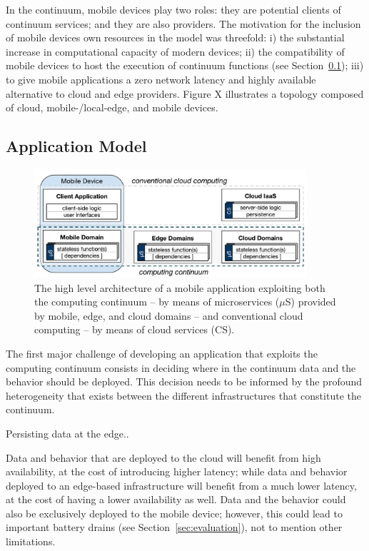 In the continuum, mobile devices play two roles: they are potential clients of continuum services; and they are also providers. The motivation for the inclusion of mobile devices own resources in the model was threefold: i) the substantial increase in computational capacity of modern devices; ii) the compatibility of mobile devices to host the execution of continuum functions (see Section~\ref{sec:application_model}); iii) to give mobile applications a zero network latency and highly available alternative to cloud and edge providers. Figure X illustrates a topology composed of cloud, mobile-/local-edge, and mobile devices.


\subsection{Application Model}\label{sec:application_model}

\begin{figure}[tbp]
	\includegraphics[width=0.9\textwidth]{figs/Continuum-arch}
	\caption{The high level architecture of a mobile application exploiting both the computing continuum -- by means of microservices ($\mu$S) provided by mobile, edge, and cloud domains -- and conventional cloud computing -- by means of cloud services (CS).}
	\label{fig:Continuum-arch}
\end{figure}

The first major challenge of developing an application that exploits the computing continuum consists in deciding where in the continuum data and the behavior should be deployed. This decision needs to be informed by the profound heterogeneity that exists between the different infrastructures that constitute the continuum.

Persisting data at the edge.. 

Data and behavior that are deployed to the cloud will benefit from high availability, at the cost of introducing higher latency; while data and behavior deployed to an edge-based infrastructure will benefit from a much lower latency, at the cost of having a lower availability as well. Data and the behavior could also be exclusively deployed to the mobile device; however, this could lead to important battery drains (see Section~\ref{sec:evaluation}), not to mention other limitations.



